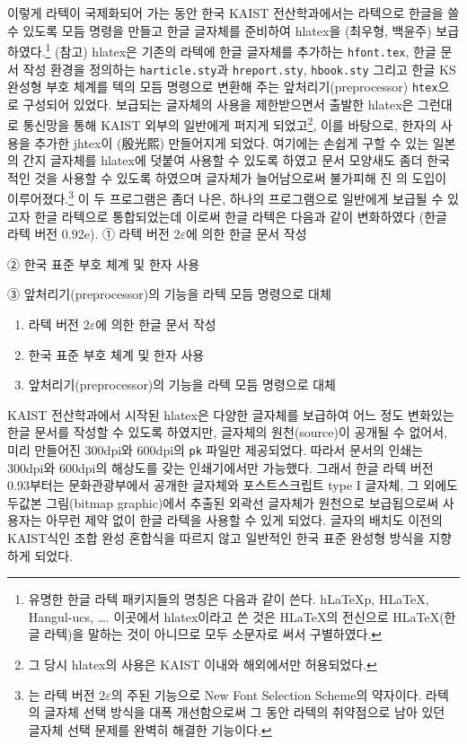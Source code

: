 이렇게 라텍이 국제화되어 가는 동안 한국 KAIST 전산학과에서는 라텍으로
한글을 쓸 수 있도록 모듬 명령을 만들고 한글 글자체를 준비하여
hlatex을 (최우형, 백윤주) 보급하였다.\footnote{%
  유명한 한글 라텍 패키지들의 명칭은 다음과 같이 쓴다. h\LaTeX{p},
  H\LaTeX, Hangul-ucs, \kotex\ldots.
  이곳에서 hlatex이라고 쓴 것은 H\LaTeX 의
  전신으로 H\LaTeX(한글 라텍)을 말하는 것이 아니므로 모두 소문자로
  써서 구별하였다.}
(\cite{ChoiWH92}\를 참고) hlatex은 기존의 라텍에 한글 글자체를 추가하는
\texttt{hfont.tex}, 한글 문서 작성 환경을 정의하는
\texttt{harticle.sty}과 \texttt{hreport.sty}, \texttt{hbook.sty} 그리고
한글 KS 완성형 부호 체계를 텍의 모듬 명령으로 변환해 주는
앞처리기(preprocessor) \texttt{htex}으로 구성되어 있었다.  보급되는
글자체의 사용을 제한받으면서 출발한 hlatex은 그런대로 통신망을 통해
KAIST 외부의 일반에게 퍼지게 되었고\footnote{그 당시 hlatex의 사용은
  KAIST 이내와 해외에서만 허용되었다.}, 이를 바탕으로, 한자의
사용을 추가한 jhtex이 (殷光熙) 만들어지게 되었다.  여기에는 손쉽게
구할 수 있는 일본의 간지 글자체를 hlatex에 덧붙여 사용할 수 있도록
하였고 문서 모양새도 좀더 한국적인 것을 사용할 수 있도록 하였으며 글자체가
늘어남으로써 불가피해 진 \NFSS{}의 도입이
이루어졌다.\footnote{\NFSS{}는 라텍 버전 2$\varepsilon$의 주된
  기능으로 New Font Selection Scheme의 약자이다.  라텍의 글자체 선택
  방식을 대폭 개선함으로써 그 동안 라텍의 취약점으로 남아 있던 글자체
  선택 문제를 완벽히 해결한 기능이다.}  이 두 프로그램은 좀더 나은,
하나의 프로그램으로 일반에게 보급될 수 있고자
한글 라텍으로 통합되었는데 이로써 한글 라텍은 다음과
같이 변화하였다 (한글 라텍 버전 0.92e).
\ifEUCmode
① 라텍 버전 2$\varepsilon$에 의한 한글 문서 작성

② 한국 표준 부호 체계 및 한자 사용

③ 앞처리기(preprocessor)의 기능을 라텍 모듬 명령으로 대체
\else
\begin{enumerate}[①]
\item 라텍 버전 2$\varepsilon$에 의한 한글 문서 작성
\item 한국 표준 부호 체계 및 한자 사용
\item 앞처리기(preprocessor)의 기능을 라텍 모듬 명령으로 대체
\end{enumerate}
\fi

KAIST 전산학과에서 시작된 hlatex은 다양한 글자체를 보급하여 어느 정도
변화있는 한글 문서를 작성할 수 있도록 하였지만, 글자체의 원천(source)이
공개될 수 없어서, 미리 만들어진 300dpi와 600dpi의 \texttt{pk} 파일만
제공되었다.  따라서 문서의 인쇄는 300dpi와 600dpi의 해상도를 갖는
인쇄기에서만 가능했다.  그래서 한글 라텍 버전 0.93부터는
문화관광부에서 공개한 글자체와 포스트스크립트 type I 글자체, 그 외에도 두값본
그림(bitmap graphic)에서 추출된 외곽선 글자체가 \MF{} 원천으로
보급됩으로써 사용자는 아무런 제약 없이 한글 라텍을 사용할 수 있게
되었다.  글자의 배치도 이전의 KAIST식인 조합 완성 혼합식을 따르지
않고 일반적인 한국 표준 완성형 방식을 지향하게 되었다.


